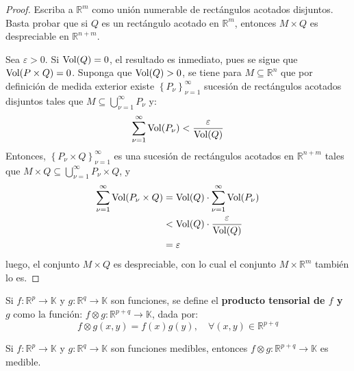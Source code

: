 \documentclass[12pt]{report}
\theoremstyle{largebreak}
\newcommand\cf[3]{\ensuremath{#1:#2\rightarrow#3}}
\begin{document}
    \begin{proof}
        Escriba a $\mathbb{R}^m$ como unión numerable de rectángulos acotados disjuntos. Basta probar que si $Q$ es un rectángulo acotado en $\mathbb{R}^m$, entonces $M\times Q$ es despreciable en $\mathbb{R}^{ n+m}$.

        Sea $\varepsilon>0$. Si $\textup{Vol}(Q)=0$, el resultado es inmediato, pues se sigue que $\textup{Vol}(P\times Q)=0$. Suponga que $\textup{Vol}(Q)>0$, se tiene para $M\subseteq\mathbb{R}^n$ que por definición de medida exterior existe $\left\{P_\nu \right\}_{\nu=1}^\infty$ sucesión de rectángulos acotados disjuntos tales que $M\subseteq \bigcup_{ \nu=1}^\infty P_\nu$ y:
        \begin{equation*}
            \sum_{ \nu=1}^{\infty}\textup{Vol}(P_\nu)<\frac{\varepsilon}{\textup{Vol}(Q)}
        \end{equation*}
        Entonces, $\left\{P_\nu\times Q \right\}_{\nu=1}^\infty$ es una sucesión de rectángulos acotados en $\mathbb{R}^{n+m}$ tales que $M\times Q\subseteq \bigcup_{ \nu=1}^\infty P_\nu\times Q$, y
        \begin{equation*}
            \begin{split}
                \sum_{ \nu=1}^{\infty}\textup{Vol}(P_\nu\times Q)&=\textup{Vol}(Q)\cdot\sum_{ \nu=1}^{\infty}\textup{Vol}(P_\nu)\\
                &<\textup{Vol}(Q)\cdot\frac{\varepsilon}{\textup{Vol}(Q)} \\
                &=\varepsilon\\
            \end{split}
        \end{equation*}
        luego, el conjunto $M\times Q$ es despreciable, con lo cual el conjunto $M\times\mathbb{R}^m$ también lo es.
    \end{proof}

    \begin{mydef}
        Si $\cf{f}{\mathbb{R}^p}{\mathbb{K}}$ y $\cf{g}{\mathbb{R}^q}{\mathbb{K}}$ son funciones, se define el \textbf{producto tensorial de $f$ y $g$} como la función: $\cf{f\otimes g}{\mathbb{R}^{ p+q}}{\mathbb{K}}$, dada por:
        \begin{equation*}
            f\otimes g(x,y)=f(x)g(y),\quad\forall (x,y)\in\mathbb{R}^{ p+q}
        \end{equation*}
    \end{mydef}

    \begin{propo}
        Si $\cf{f}{\mathbb{R}^p}{\mathbb{K}}$ y $\cf{g}{\mathbb{R}^q}{\mathbb{K}}$ son funciones medibles, entonces $\cf{f\otimes g}{\mathbb{R}^{ p+q}}{\mathbb{K}}$ es medible.
    \end{propo}
\end{document}
